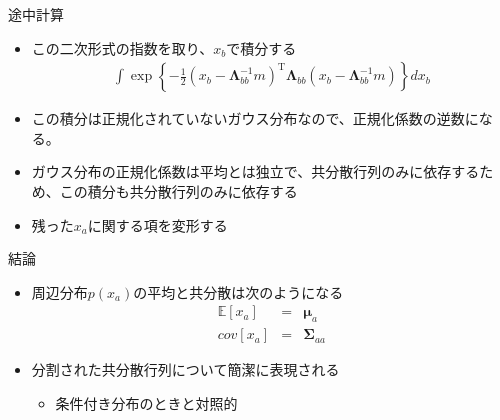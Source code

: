 \begin{frame}{途中計算}
 \begin{itemize}
  \item この二次形式の指数を取り、$x_b$で積分する
        \begin{eqnarray}
         \int \exp\left\{-\frac{1}{2}(x_b-\bm{\Lambda}_{bb}^{-1}m)^{\mathrm{T}}\bm{\Lambda}_{bb}(x_b-\bm{\Lambda}_{bb}^{-1}m)\right\}dx_b
        \end{eqnarray}
  \item この積分は正規化されていないガウス分布なので、正規化係数の逆数になる。
  \item ガウス分布の正規化係数は平均とは独立で、共分散行列のみに依存するため、この積分も共分散行列のみに依存する
  \item 残った$x_a$に関する項を変形する
 \end{itemize}
\end{frame}

\begin{frame}{結論}
 \begin{itemize}
  \item 周辺分布$p(x_a)$の平均と共分散は次のようになる
        \begin{eqnarray}
         \mathbb{E}[x_a] &=&  \bm{\mu}_a\\
         cov[x_a]&=&\bm{\Sigma}_{aa}
        \end{eqnarray}
  \item 分割された共分散行列について簡潔に表現される
        \begin{itemize}
         \item 条件付き分布のときと対照的
        \end{itemize}
 \end{itemize}
\end{frame}
